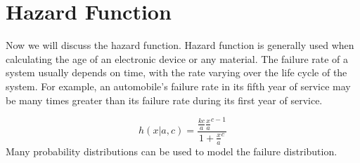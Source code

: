 \documentclass[a4paper, 11pt]{article}
\numberwithin{equation}{section}
\begin{document}
\section{Hazard Function}
\begin{theorem}
Now we will discuss the hazard function. Hazard function is generally used when calculating the age of an electronic device or any material. The failure rate of a system usually depends on time, with the rate varying over the life cycle of the system. For example, an automobile's failure rate in its fifth year of service may be many times greater than its failure rate during its first year of service.
\end{theorem}
\begin{equation}
h(x|a,c)=\frac{\frac{kc}{a}\frac{x}{a}^{c-1}}{1+\frac{x}{a}^{c}}
\end{equation}
Many probability distributions can be used to model the failure distribution.
\end{document}
